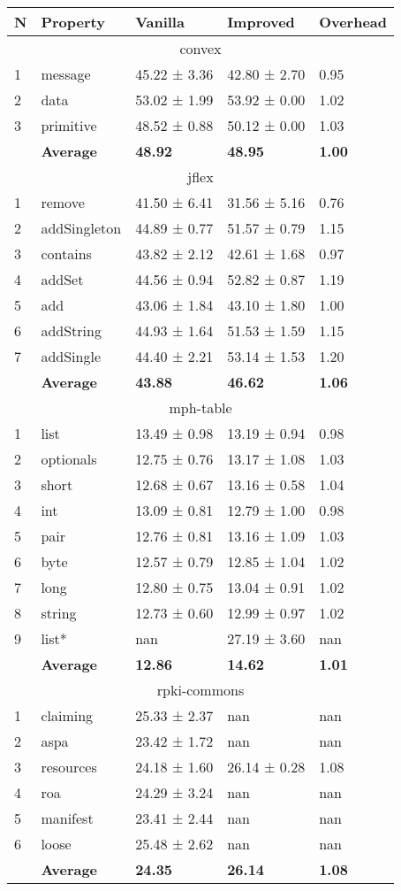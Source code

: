\begin{tabular}{lllll}
N & Property & Vanilla & Improved & Overhead \\
\hline
\multicolumn{5}{c}{convex} \\
\hline
1 & message & 45.22 ± 3.36 & 42.80 ± 2.70 & 0.95 \\
2 & data & 53.02 ± 1.99 & 53.92 ± 0.00 & 1.02 \\
3 & primitive & 48.52 ± 0.88 & 50.12 ± 0.00 & 1.03 \\
\textbf{} & \textbf{Average} & \textbf{48.92} & \textbf{48.95} & \textbf{1.00} \\
\hline
\multicolumn{5}{c}{jflex} \\
\hline
1 & remove & 41.50 ± 6.41 & 31.56 ± 5.16 & 0.76 \\
2 & addSingleton & 44.89 ± 0.77 & 51.57 ± 0.79 & 1.15 \\
3 & contains & 43.82 ± 2.12 & 42.61 ± 1.68 & 0.97 \\
4 & addSet & 44.56 ± 0.94 & 52.82 ± 0.87 & 1.19 \\
5 & add & 43.06 ± 1.84 & 43.10 ± 1.80 & 1.00 \\
6 & addString & 44.93 ± 1.64 & 51.53 ± 1.59 & 1.15 \\
7 & addSingle & 44.40 ± 2.21 & 53.14 ± 1.53 & 1.20 \\
\textbf{} & \textbf{Average} & \textbf{43.88} & \textbf{46.62} & \textbf{1.06} \\
\hline
\multicolumn{5}{c}{mph-table} \\
\hline
1 & list & 13.49 ± 0.98 & 13.19 ± 0.94 & 0.98 \\
2 & optionals & 12.75 ± 0.76 & 13.17 ± 1.08 & 1.03 \\
3 & short & 12.68 ± 0.67 & 13.16 ± 0.58 & 1.04 \\
4 & int & 13.09 ± 0.81 & 12.79 ± 1.00 & 0.98 \\
5 & pair & 12.76 ± 0.81 & 13.16 ± 1.09 & 1.03 \\
6 & byte & 12.57 ± 0.79 & 12.85 ± 1.04 & 1.02 \\
7 & long & 12.80 ± 0.75 & 13.04 ± 0.91 & 1.02 \\
8 & string & 12.73 ± 0.60 & 12.99 ± 0.97 & 1.02 \\
9 & list* & nan & 27.19 ± 3.60 & nan \\
\textbf{} & \textbf{Average} & \textbf{12.86} & \textbf{14.62} & \textbf{1.01} \\
\hline
\multicolumn{5}{c}{rpki-commons} \\
\hline
1 & claiming & 25.33 ± 2.37 & nan & nan \\
2 & aspa & 23.42 ± 1.72 & nan & nan \\
3 & resources & 24.18 ± 1.60 & 26.14 ± 0.28 & 1.08 \\
4 & roa & 24.29 ± 3.24 & nan & nan \\
5 & manifest & 23.41 ± 2.44 & nan & nan \\
6 & loose & 25.48 ± 2.62 & nan & nan \\
\textbf{} & \textbf{Average} & \textbf{24.35} & \textbf{26.14} & \textbf{1.08} \\
\end{tabular}
